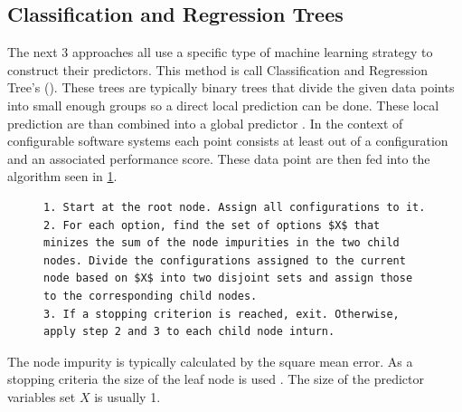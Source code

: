 \subsection{Classification and Regression Trees}
\label{sec:CART}
The next 3 approaches all use a specific type of machine learning strategy to construct their predictors. This method is call Classification and Regression Tree's (\CART). These trees are typically binary trees that divide the given data points into small enough groups so a direct local prediction can be done.
These local prediction are than combined into a global predictor \cite{VariabilityAwarePerformancePredictionJianmeiSigmundApel}. In the context of configurable software systems each point consists at least out of a configuration and an associated performance score. These data point are then fed into the algorithm seen in \cref{alg:CART}.
\begin{figure}[h]
	\lstset{
		mathescape,
		breaklines=true,
	}
	\begin{lstlisting}
1. Start at the root node. Assign all configurations to it.
2. For each option, find the set of options $X$ that minizes the sum of the node impurities in the two child nodes. Divide the configurations assigned to the current node based on $X$ into two disjoint sets and assign those to the corresponding child nodes.
3. If a stopping criterion is reached, exit. Otherwise, apply step 2 and 3 to each child node inturn.
	\end{lstlisting}
	\label{alg:CART}
\end{figure}
The node impurity is typically calculated by the square mean error. As a stopping criteria the size of the leaf node is used \cite{VariabilityAwarePerformancePredictionJianmeiSigmundApel}. The size of the predictor variables set $X$ is usually 1.
